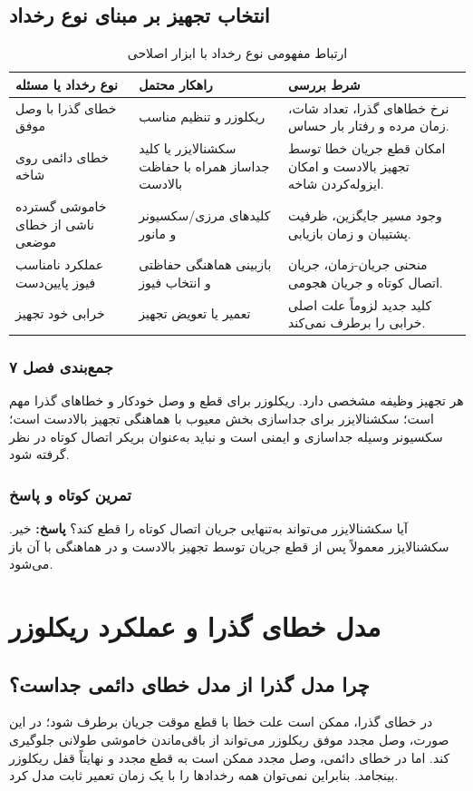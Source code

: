 \documentclass[11pt,a4paper,oneside]{book}
\newcommand{\summary}[1]{\subsection*{جمع‌بندی فصل #1}}
\newcommand{\exercise}{\subsection*{تمرین کوتاه و پاسخ}}
\newcommand{\answer}{\noindent\textbf{پاسخ:} }
\begin{document}
\section{انتخاب تجهیز بر مبنای نوع رخداد}
\begin{table}[ht]
\centering\small
\caption{ارتباط مفهومی نوع رخداد با ابزار اصلاحی}\label{tab:device-choice}
\begin{tabularx}{\textwidth}{p{3.1cm}p{3.4cm}X}
\toprule
نوع رخداد یا مسئله & راهکار محتمل & شرط بررسی \\
\midrule
خطای گذرا با وصل موفق & ریکلوزر و تنظیم مناسب & نرخ خطاهای گذرا، تعداد شات، زمان مرده و رفتار بار حساس.\\
خطای دائمی روی شاخه & سکشنالایزر یا کلید جداساز همراه با حفاظت بالادست & امکان قطع جریان خطا توسط تجهیز بالادست و امکان ایزوله‌کردن شاخه.\\
خاموشی گسترده ناشی از خطای موضعی & کلیدهای مرزی/سکسیونر و مانور & وجود مسیر جایگزین، ظرفیت پشتیبان و زمان بازیابی.\\
عملکرد نامناسب فیوز پایین‌دست & بازبینی هماهنگی حفاظتی و انتخاب فیوز & منحنی جریان-زمان، جریان اتصال کوتاه و جریان هجومی.\\
خرابی خود تجهیز & تعمیر یا تعویض تجهیز & کلید جدید لزوماً علت اصلی خرابی را برطرف نمی‌کند.\\
\bottomrule
\end{tabularx}
\end{table}

\summary{۷}
هر تجهیز وظیفه مشخصی دارد. ریکلوزر برای قطع و وصل خودکار و خطاهای گذرا مهم است؛ سکشنالایزر برای جداسازی بخش معیوب با هماهنگی تجهیز بالادست است؛ سکسیونر وسیله جداسازی و ایمنی است و نباید به‌عنوان بریکر اتصال کوتاه در نظر گرفته شود.

\exercise
آیا سکشنالایزر می‌تواند به‌تنهایی جریان اتصال کوتاه را قطع کند؟
\answer خیر. سکشنالایزر معمولاً پس از قطع جریان توسط تجهیز بالادست و در هماهنگی با آن باز می‌شود.

\chapter{مدل خطای گذرا و عملکرد ریکلوزر}
\section{چرا مدل گذرا از مدل خطای دائمی جداست؟}
در خطای گذرا، ممکن است علت خطا با قطع موقت جریان برطرف شود؛ در این صورت، وصل مجدد موفق ریکلوزر می‌تواند از باقی‌ماندن خاموشی طولانی جلوگیری کند. اما در خطای دائمی، وصل مجدد ممکن است به قطع مجدد و نهایتاً قفل ریکلوزر بینجامد. بنابراین نمی‌توان همه رخدادها را با یک زمان تعمیر ثابت مدل کرد.
\end{document}
